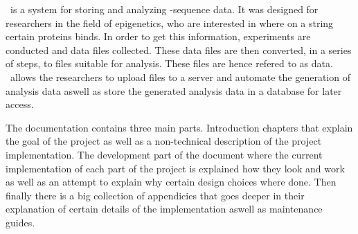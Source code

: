 \appName\ is a system for storing and analyzing -sequence data. It was designed for researchers in the field of epigenetics, who are interested in where on a  string certain proteins binds. In order to get this information, experiments are conducted and  data files collected. These data files are then converted, in a series of steps, to files suitable for analysis. These files are hence refered to as  data. \appName\ allows the researchers to upload  files to a server and automate the generation of analysis data aswell as store the generated analysis data in a database for later access. 

The documentation contains three main parts. Introduction chapters that explain the goal of the project as well as a non-technical description of the project implementation. The development part of the document where the current implementation of each part of the project is explained how they look and work as well as an attempt to explain why certain design choices where done. Then finally there is a big collection of appendicies that goes deeper in their explanation of certain details of the implementation aswell as maintenance guides.

